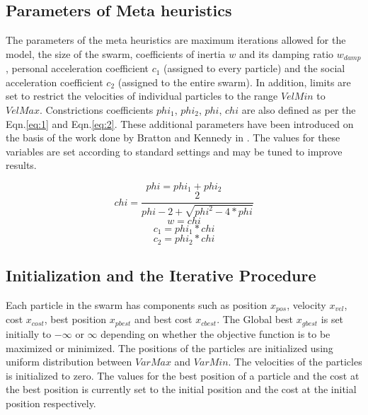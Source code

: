 \documentclass{svproc}
\begin{document}
\subsection{Parameters of Meta heuristics}
The parameters of the meta heuristics are maximum iterations allowed for the model, the size of the swarm, coefficients of inertia $w$ and its damping ratio $w_{damp}$ , personal acceleration coefficient $c_1$ (assigned to every particle) and the social acceleration coefficient $c_2$ (assigned to the entire swarm). In addition, limits are set to restrict the velocities of individual particles to the range $VelMin$ to $VelMax$. Constrictions coefficients $phi_1$, $phi_2$, $phi$, $chi$ are also defined as per the Eqn.\ref{eq:1} and Eqn.\ref{eq:2}. These additional parameters have been introduced on the basis of the work done by Bratton and Kennedy in \cite{ppr:9}. The values for these variables are set according to standard settings and may be tuned to improve results. 

\begin{equation}\label{eq:1}
phi = phi_1 + phi_2 
\end{equation}\label{eq:2}
\begin{equation}
chi = \frac{2}{phi - 2 + \sqrt{phi^2 - 4*phi}}
\end{equation}
\begin{equation}
w = chi
\end{equation}
\begin{equation}
c_1 = phi_1 * chi
\end{equation}
\begin{equation}
c_2 = phi_2 * chi
\end{equation}

\subsection{Initialization and the Iterative Procedure}

Each particle in the swarm has components such as position $x_{pos}$, velocity $x_{vel}$, cost $x_{cost}$, best position $x_{pbest}$ and best cost $x_{cbest}$. The Global best $x_{gbest}$ is set initially to $- \infty$ or $\infty$ depending on whether the objective function is to be maximized or minimized. The positions of the particles are initialized using uniform distribution between $VarMax$ and $VarMin$. The velocities of the particles is initialized to zero. The values for the best position of a particle and the cost at the best position is currently set to the initial position and the cost at the initial position respectively. \\
\end{document}
